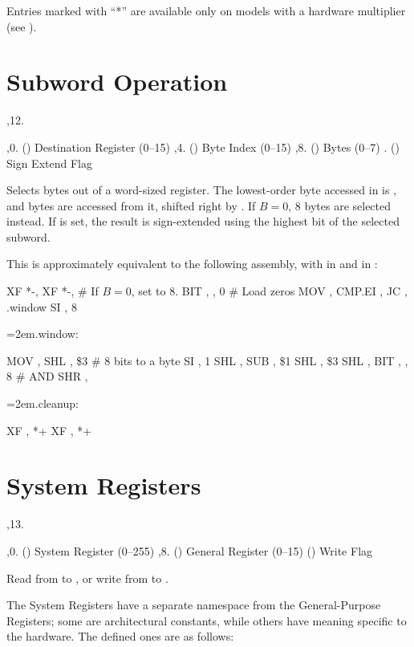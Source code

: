 Entries marked with ``*'' are available only on models with a hardware
multiplier (see ).

\section{Subword Operation}

\noindent\ins{},12. 

\li \ins{},0. () Destination Register (0--15)
\li \ins{},4. () Byte Index (0--15)
\li \ins{},8. () Bytes (0--7)
\li \ins{}. () Sign Extend Flag

Selects bytes out of a word-sized register. The lowest-order byte accessed in
 is , and  bytes are accessed from it, shifted right by
. If $B = 0$, 8 bytes are selected instead. If  is set, the
result is sign-extended using the highest bit of the selected subword.

This is approximately equivalent to the following assembly, with  in
 and  in :

\startblock
	XF *-, 
	XF *-, 
	\# If $B = 0$, set  to 8.
	BIT , , 0  \# Load zeros
	MOV , 
	CMP.EI , 
	JC , .window
	SI , 8
{\leftskip=2em.window:\par}
	MOV , 
	SHL , \$3  \# 8 bits to a byte
	SI , 1
	SHL , 
	SUB , \$1
	SHL , \$3
	SHL , 
	BIT , , 8  \# AND
	SHR , 
{\leftskip=2em.cleanup:\par}
	XF , *+
	XF , *+
\endblock

\section{System Registers}

\noindent\ins{},13. 

\li \ins{},0. () System Register (0--255)
\li \ins{},8. () General Register (0--15)
\li \ins{} () Write Flag

Read from  to , or write from  to .

The System Registers have a separate namespace from the General-Purpose
Registers; some are architectural constants, while others have meaning specific
to the hardware. The defined ones are as follows:

